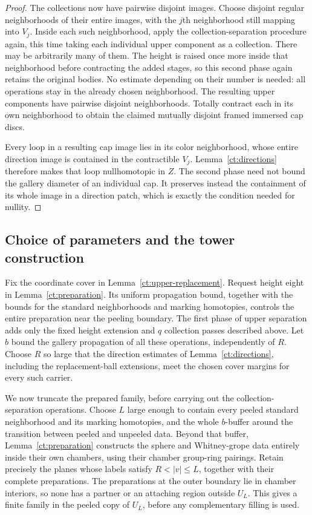\documentclass[11pt]{article}
\theoremstyle{definition}
\theoremstyle{remark}
\begin{document}
\begin{proof}
The collections now have pairwise disjoint images. Choose disjoint
regular neighborhoods of their entire images, with the $j$th
neighborhood still mapping into $V_j$. Inside each such neighborhood,
apply the collection-separation procedure again, this time taking
each individual upper component as a collection. There may be
arbitrarily many of them. The height is raised once more inside that
neighborhood before contracting the added stages, so this second
phase again retains the original bodies. No estimate depending on
their number is needed: all operations stay in the already chosen
neighborhood. The resulting upper components have pairwise disjoint
neighborhoods. Totally contract each in its own neighborhood to obtain
the claimed mutually disjoint framed immersed cap discs.

Every loop in a resulting cap image lies in its color neighborhood,
whose entire direction image is contained in the contractible $V_j$.
Lemma~\ref{ct:directions} therefore makes that loop nullhomotopic in
$Z$. The second phase need not bound the gallery diameter of an
individual cap. It preserves instead the containment of its whole
image in a direction patch, which is exactly the condition needed
for nullity.
\end{proof}

\subsection{Choice of parameters and the tower construction}

Fix the coordinate cover in Lemma~\ref{ct:upper-replacement}. Request
height eight in Lemma~\ref{ct:preparation}. Its uniform propagation
bound, together with the bounds for the standard neighborhoods and
marking homotopies, controls the entire preparation near the peeling
boundary. The first phase of upper separation adds only the fixed
height extension and $q$ collection passes described above. Let $b$
bound the gallery propagation of all these operations, independently
of $R$. Choose $R$ so large that the direction estimates of
Lemma~\ref{ct:directions}, including the replacement-ball extensions,
meet the chosen cover margins for every such carrier.

We now truncate the prepared family, before carrying out the
collection-separation operations. Choose $L$ large enough to contain
every peeled standard neighborhood and its marking homotopies, and
the whole $b$-buffer around the transition between peeled and
unpeeled data. Beyond that buffer, Lemma~\ref{ct:preparation} constructs
the sphere and Whitney-grope data entirely inside their own chambers,
using their chamber group-ring pairings. Retain precisely the planes
whose labels satisfy $R<|v|\le L$, together with their complete
preparations. The preparations at the outer boundary lie in chamber
interiors, so none has a partner or an attaching region outside
$U_L$. This gives a finite family in the peeled copy of $U_L$, before
any complementary filling is used.
\end{document}
